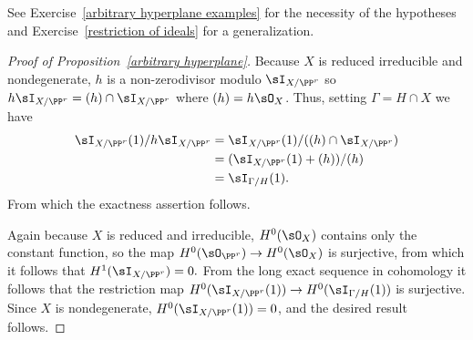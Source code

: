 See Exercise~\ref{arbitrary hyperplane examples} for the necessity of the hypotheses
and Exercise~\ref{restriction of ideals} for a generalization. 

\begin{proof}[Proof of Proposition~\ref{arbitrary hyperplane}]
Because $X$ is reduced irreducible and nondegenerate,
$h$ is a non-zerodivisor modulo $\sI_{X/\PP^r}$ so $h\sI_{X/\PP^r} = (h)\cap \sI_{X/\PP^r}$ where
$(h) = h\sO_{X}$. Thus, setting $\Gamma = {H\cap X}$
we have 
$$
\begin{aligned}
\sI_{X/\PP^r}(1)/h\sI_{X/\PP^r} &= \sI_{X/\PP^r}(1)/((h)\cap\sI_{X/\PP^r})\\
 &=(\sI_{X/\PP^r}(1)+(h))/(h)\\
 &= \sI_{\Gamma/H}(1).
\end{aligned}
 $$
 From which the exactness assertion follows.
 
 Again because $X$ is reduced and irreducible, $H^0(\sO_X)$ contains only the constant function, so the map $H^0(\sO_{\PP^r}) \to H^0(\sO_X)$ is surjective, 
from which it follows that $H^1(\sI_{X/\PP^r}) = 0.$ From the long exact sequence in cohomology it follows that
 the restriction map $H^0(\sI_{X/\PP^r}(1))\to H^0(\sI_{\Gamma/H}(1))$ is surjective. Since
$X$ is nondegenerate, $H^0(\sI_{X/\PP^r}(1)) = 0$, and the desired result follows.
\end{proof}


